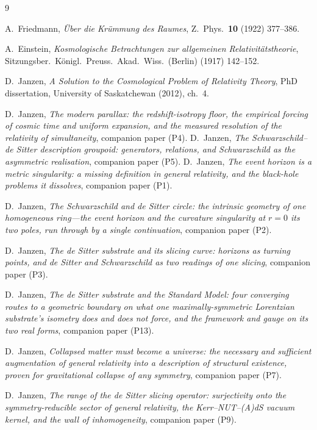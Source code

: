\documentclass[11pt,a4paper]{article}
\theoremstyle{definition}
\begin{document}
\begin{thebibliography}{9}

A.~Friedmann,
\emph{\"Uber die Kr\"ummung des Raumes},
Z.~Phys.~\textbf{10} (1922) 377--386.

A.~Einstein,
\emph{Kosmologische Betrachtungen zur allgemeinen Relativit\"atstheorie},
Sitzungsber.~K\"onigl.~Preuss.~Akad.~Wiss.~(Berlin) (1917) 142--152.


 D.~Janzen, \emph{A Solution to the Cosmological Problem of Relativity Theory}, PhD dissertation, University of Saskatchewan (2012), ch.~4.

 D.~Janzen, \emph{The modern parallax: the redshift-isotropy floor, the empirical forcing of cosmic time and uniform expansion, and the measured resolution of the relativity of simultaneity}, companion paper (P4).
 D.~Janzen, \emph{The Schwarzschild--de Sitter description groupoid: generators, relations, and Schwarzschild as the asymmetric realisation}, companion paper (P5).
D.~Janzen,
\emph{The event horizon is a metric singularity: a missing definition in general relativity, and the black-hole problems it dissolves}, companion paper (P1).

D.~Janzen,
\emph{The Schwarzschild and de Sitter circle: the intrinsic geometry of one homogeneous ring---the event horizon and the curvature singularity at $r=0$ its two poles, run through by a single continuation}, companion paper (P2).

D.~Janzen,
\emph{The de Sitter substrate and its slicing curve: horizons as turning points, and de Sitter and Schwarzschild as two readings of one slicing}, companion paper (P3).

 D.~Janzen, \emph{The de Sitter substrate and the Standard Model: four converging routes to a geometric boundary on what one maximally-symmetric Lorentzian substrate's isometry does and does not force, and the framework and gauge on its two real forms}, companion paper (P13).

 D.~Janzen, \emph{Collapsed matter must become a universe: the necessary and sufficient augmentation of general relativity into a description of structural existence, proven for gravitational collapse of any symmetry}, companion paper (P7).

D.~Janzen,
\emph{The range of the de Sitter slicing operator: surjectivity onto the symmetry-reducible sector of general relativity, the Kerr--NUT--(A)dS vacuum kernel, and the wall of inhomogeneity}, companion paper (P9).


\end{thebibliography}
\end{document}
